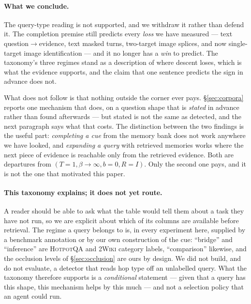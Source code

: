 \paragraph{What we conclude.} The query-type reading is not supported, and we withdraw it
rather than defend it. The completion premise still predicts every \emph{loss} we have
measured --- text question$\to$evidence, text masked turns, two-target image splices, and
now single-target image identification --- and it no longer has a \emph{win} to predict.
The taxonomy's three regimes stand as a description of where descent loses, which is what
the evidence supports, and the claim that one sentence predicts the sign in advance does
not.

What does not follow is that nothing outside the corner ever pays. \S\ref{sec:corpora}
reports one mechanism that does, on a question shape that is \emph{stated} in advance rather
than found afterwards --- but stated is not the same as detected, and the next paragraph says
what that costs. The distinction between the two findings is the useful part: \emph{completing a cue} from
the memory bank does not work anywhere we have looked, and \emph{expanding a query} with
retrieved memories works where the next piece of evidence is reachable only from the
retrieved evidence. Both are departures from $(T{=}1,\beta\to\infty,b{=}0,R{=}I)$. Only the
second one pays, and it is not the one that motivated this paper.

\paragraph{This taxonomy explains; it does not yet route.} A reader should be able to ask
what the table would tell them about a task they have not run, so we are explicit about which
of its columns are available before retrieval. The regime a query belongs to is, in every
experiment here, supplied by a benchmark annotation or by our own construction of the cue:
``bridge'' and ``inference'' are \textsc{HotpotQA} and \textsc{2Wiki} category labels,
``comparison'' likewise, and the occlusion levels of \S\ref{sec:occlusion} are ours by
design. We did not build, and do not evaluate, a detector that reads hop type off an
unlabelled query. What the taxonomy therefore supports is a \emph{conditional} statement ---
given that a query has this shape, this mechanism helps by this much --- and not a selection
policy that an agent could run.

